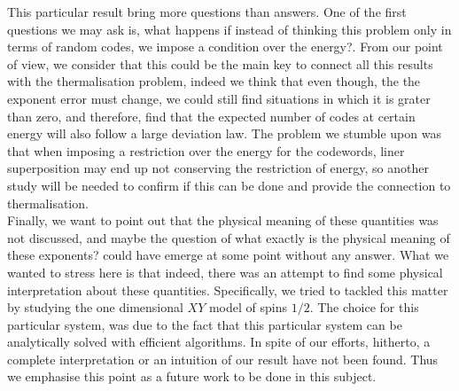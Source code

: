 \indent This particular result bring more questions than answers. One of the first questions we may ask is, what happens if instead of thinking this problem only in terms of random codes, we impose a condition over the energy?. From our point of view, we consider that this could be the main key to connect all this results with the thermalisation problem, indeed we think that even though, the the exponent error must change, we could still find situations in which it is grater than zero, and therefore, find that the expected number of codes at certain energy will also follow a large deviation law. The problem we stumble upon was that when imposing a restriction over the energy for the codewords, liner superposition may end up not conserving the restriction of energy, so another study will be needed to confirm if this can be done and provide the connection to thermalisation.\\

\indent Finally, we want to point out that the physical meaning of these quantities was not discussed, and maybe the question of  what exactly is the physical meaning of these exponents? could have emerge at some point without any answer. What we wanted to stress here is that indeed, there was an attempt to find some physical interpretation about these quantities. Specifically, we tried to tackled this matter by studying the one dimensional $XY$ model of spins $1/2$. The choice for this particular system, was due to the fact that this particular system can be analytically solved with efficient algorithms. In spite of our efforts, hitherto, a complete interpretation or an intuition of our result have not been found. Thus we emphasise this point as a future work to be done in this subject.




